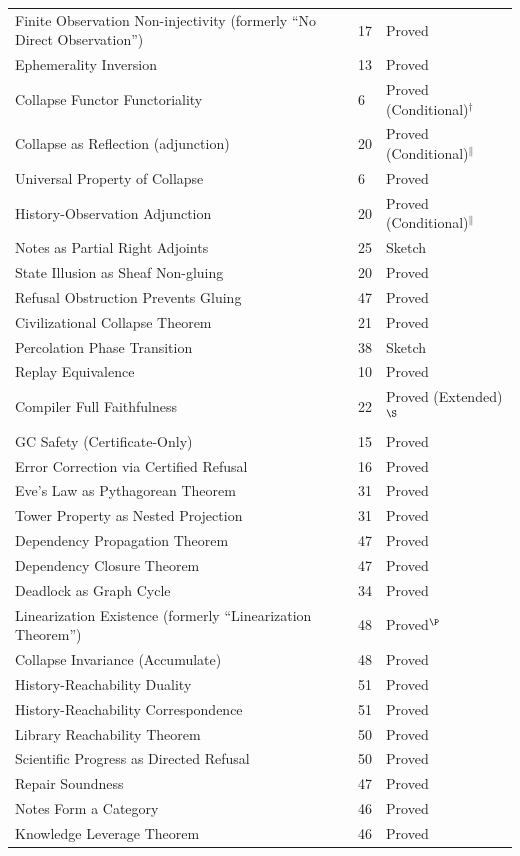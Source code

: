 \documentclass[12pt, a4paper, openany]{book}
\theoremstyle{plain}
\theoremstyle{definition}
\theoremstyle{remark}
\begin{document}
\begin{center}
\begin{longtable}{lll}
Finite Observation Non-injectivity (formerly ``No Direct Observation'') & 17 & Proved \\
Ephemerality Inversion & 13 & Proved \\
Collapse Functor Functoriality & 6 & Proved (Conditional)$^\dagger$ \\
Collapse as Reflection (adjunction) & 20 & Proved (Conditional)$^\|$ \\
Universal Property of Collapse & 6 & Proved \\
History-Observation Adjunction & 20 & Proved (Conditional)$^\|$ \\
Notes as Partial Right Adjoints & 25 & Sketch \\
State Illusion as Sheaf Non-gluing & 20 & Proved \\
Refusal Obstruction Prevents Gluing & 47 & Proved \\
Civilizational Collapse Theorem & 21 & Proved \\
Percolation Phase Transition & 38 & Sketch \\
Replay Equivalence & 10 & Proved \\
Compiler Full Faithfulness & 22 & Proved (Extended)$^\S$ \\
GC Safety (Certificate-Only) & 15 & Proved \\
Error Correction via Certified Refusal & 16 & Proved \\
Eve's Law as Pythagorean Theorem & 31 & Proved \\
Tower Property as Nested Projection & 31 & Proved \\
Dependency Propagation Theorem & 47 & Proved \\
Dependency Closure Theorem & 47 & Proved \\
Deadlock as Graph Cycle & 34 & Proved \\
Linearization Existence (formerly ``Linearization Theorem'') & 48 & Proved$^\P$ \\
Collapse Invariance (Accumulate) & 48 & Proved \\
History-Reachability Duality & 51 & Proved \\
History-Reachability Correspondence & 51 & Proved \\
Library Reachability Theorem & 50 & Proved \\
Scientific Progress as Directed Refusal & 50 & Proved \\
Repair Soundness & 47 & Proved \\
Notes Form a Category & 46 & Proved \\
Knowledge Leverage Theorem & 46 & Proved \\

\end{longtable}
\end{center}
\end{document}
